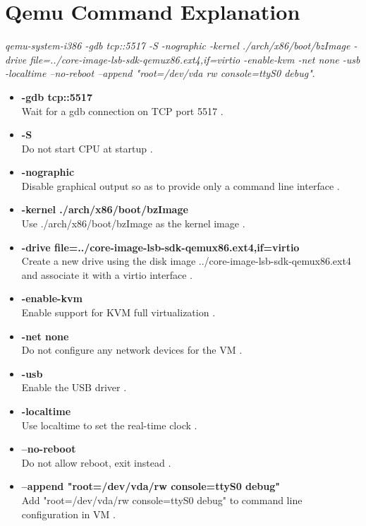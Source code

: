 \documentclass[onecolumn,draftclsnofoot, 10pt, compsoc]{IEEEtran}
\begin{document}
\section{Qemu Command Explanation}
	\textit{qemu-system-i386 -gdb tcp::5517 -S -nographic -kernel ./arch/x86/boot/bzImage -drive file=../core-image-lsb-sdk-qemux86.ext4,if=virtio -enable-kvm -net none -usb -localtime --no-reboot --append "root=/dev/vda rw console=ttyS0 debug"}. 
	\begin{itemize}
		\item \textbf{-gdb tcp::5517} \\
		Wait for a gdb connection on TCP port 5517 \cite{qemu-command-flags}.
		\item \textbf{-S} \\
		Do not start CPU at startup \cite{qemu-command-flags}.	
		\item \textbf{-nographic} \\
		Disable graphical output so as to provide only a command line interface \cite{qemu-command-flags}.
		\item \textbf{-kernel ./arch/x86/boot/bzImage} \\
		Use ./arch/x86/boot/bzImage as the kernel image \cite{qemu-command-flags}.	
		\item \textbf{-drive file=../core-image-lsb-sdk-qemux86.ext4,if=virtio} \\
		Create a new drive using the disk image ../core-image-lsb-sdk-qemux86.ext4 and associate it with a virtio interface \cite{qemu-command-flags}.
		\item \textbf{-enable-kvm} \\
		Enable support for KVM full virtualization \cite{qemu-command-flags}.
		\item \textbf{-net none} \\
		Do not configure any network devices for the VM \cite{qemu-command-flags}.
		\item \textbf{-usb} \\
		Enable the USB driver \cite{qemu-command-flags}.	
		\item \textbf{-localtime} \\
		Use localtime to set the real-time clock \cite{qemu-command-flags}.
		\item \textbf{--no-reboot} \\ 
		Do not allow reboot, exit instead \cite{qemu-command-flags}.
		\item \textbf{--append "root=/dev/vda/rw console=ttyS0 debug"} \\
		Add "root=/dev/vda/rw console=ttyS0 debug" to command line configuration in VM \cite{qemu-command-flags}.
	\end{itemize}
\end{document}
